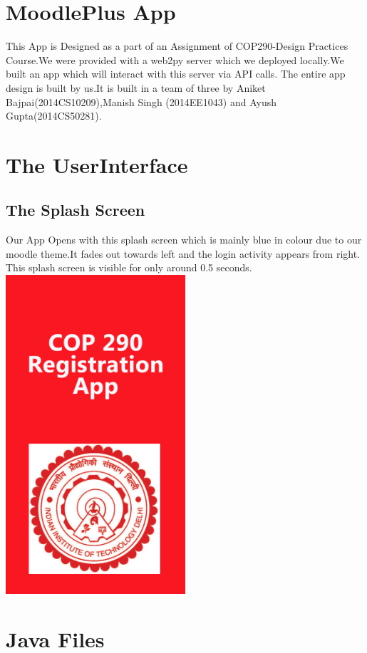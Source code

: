 \documentclass[a4paper,man,natbib]{apa6}
\title{}
\author{}
\affiliation{}
\begin{document}
\section{MoodlePlus App}

This App is Designed as a part of an Assignment of COP290-Design Practices Course.We were provided with a web2py server which we deployed locally.We built an app which will interact with this server via API calls. The entire app design is built by us.It is built in a team of three by Aniket Bajpai(2014CS10209),Manish Singh (2014EE1043) and Ayush Gupta(2014CS50281). 

\section{The UserInterface}
\subsection{The Splash Screen}
Our App Opens with this splash screen which is mainly blue in colour due to our moodle theme.It fades out towards left and the login activity appears from right. This splash screen is visible for only around 0.5 seconds.
\includegraphics[width=0.5\textwidth, center]{iit.png}

\section{Java Files}
\label{sec:examples}
\end{document}
